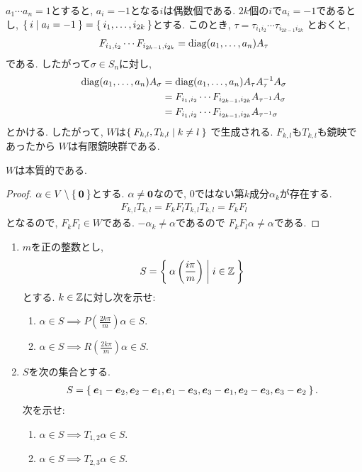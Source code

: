 $a_1\cdots a_n = 1$とすると,
$a_i=-1$となる$i$は偶数個である.
$2k$個の$i$で$a_i=-1$であるとし,
$\Set{i|a_i=-1}=\Set{i_1,\ldots,i_{2k}}$とする.
このとき, $\tau=\tau_{i_1i_2}\cdots \tau_{i_{2k-1}i_{2k}}$
とおくと,
\begin{align*}
F_{i_1,i_2}\cdots F_{i_{2k-1},i_{2k}}=\operatorname{diag}(a_1,\ldots,a_n)A_{\tau}
\end{align*}
である.  したがって$\sigma\in S_n$に対し,
\begin{align*}
  \operatorname{diag}(a_1,\ldots,a_n)A_{\sigma}
  &=\operatorname{diag}(a_1,\ldots,a_n)A_{\tau}A_{\tau}^{-1} A_{\sigma}\\
  &=F_{i_1,i_2}\cdots F_{i_{2k-1},i_{2k}}A_{\tau^{-1}} A_{\sigma}\\
  &=F_{i_1,i_2}\cdots F_{i_{2k-1},i_{2k}}A_{\tau^{-1}\sigma}
\end{align*}
とかける.
したがって, $W$は$\Set{F_{k,l}, T_{k,l}|k\neq l}$
で生成される.
$F_{k,l}$も$T_{k,l}$も鏡映であったから
$W$は有限鏡映群である.


\begin{prop}
$W$は本質的である.
\end{prop}
\begin{proof}
  $\alpha\in V\setminus\Set{\boldsymbol{0}}$とする.
  $\alpha\neq \boldsymbol{0}$なので,
  $0$ではない第$k$成分$\alpha_k$が存在する.
  \begin{align*}
    F_{k,l}T_{k,l}=F_kF_lT_{k,l}T_{k,l}=F_{k}F_{l}
  \end{align*}
  となるので,
  $F_{k}F_{l}\in W$である.
  $-\alpha_k\neq \alpha$であるので
  $F_{k}F_{l}\alpha \neq \alpha$である.
\end{proof}

\begin{enumerate}
\item 
  $m$を正の整数とし,
  \begin{align*}
    S=\Set{
      \alpha\left(\frac{i\pi}{m}\right)
      | i\in\mathbb{Z}}
  \end{align*}
  とする. $k\in\mathbb{Z}$に対し次を示せ:
  \begin{enumerate}
    \item $\alpha\in S\implies P\left(\frac{2k\pi}{m}\right) \alpha\in S$.
    \item $\alpha\in S\implies R\left(\frac{2k\pi}{m}\right) \alpha\in S$.
  \end{enumerate}
\item
  $S$を次の集合とする.
  \begin{align*}
    S=\Set{
      \boldsymbol{e}_1-\boldsymbol{e}_2,
      \boldsymbol{e}_2-\boldsymbol{e}_1,
      \boldsymbol{e}_1-\boldsymbol{e}_3,
      \boldsymbol{e}_3-\boldsymbol{e}_1,
      \boldsymbol{e}_2-\boldsymbol{e}_3,
      \boldsymbol{e}_3-\boldsymbol{e}_2
    }.
  \end{align*}
  次を示せ:
  \begin{enumerate}
    \item $\alpha\in S\implies T_{1,2}\alpha \in S$.
    \item $\alpha\in S\implies T_{2,3}\alpha \in S$.
  \end{enumerate}
\end{enumerate}


